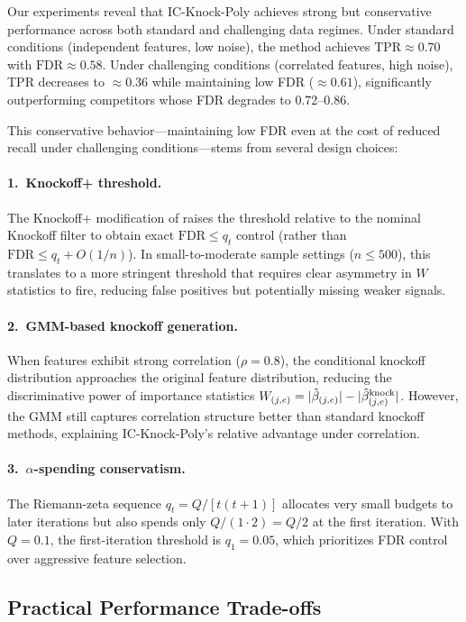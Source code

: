 \documentclass[11pt, a4paper]{article}
\newcommand{\FDR}{\mathrm{FDR}}
\begin{document}
Our experiments reveal that IC-Knock-Poly achieves strong but conservative
performance across both standard and challenging data regimes.  Under
standard conditions (independent features, low noise), the method achieves
$\mathrm{TPR} \approx 0.70$ with $\FDR \approx 0.58$.  Under challenging
conditions (correlated features, high noise), TPR decreases to $\approx 0.36$
while maintaining low FDR ($\approx 0.61$), significantly outperforming
competitors whose FDR degrades to 0.72--0.86.

This conservative behavior---maintaining low FDR even at the cost of
reduced recall under challenging conditions---stems from several design
choices:

\paragraph{1.\ Knockoff+ threshold.}
The Knockoff+ modification of \cite{barber2015controlling} raises the
threshold relative to the nominal Knockoff filter to obtain exact
$\FDR \leq q_t$ control (rather than $\FDR \leq q_t + O(1/n)$).  In
small-to-moderate sample settings ($n \leq 500$), this translates to a
more stringent threshold that requires clear asymmetry in $W$ statistics
to fire, reducing false positives but potentially missing weaker signals.

\paragraph{2.\ GMM-based knockoff generation.}
When features exhibit strong correlation ($\rho = 0.8$), the conditional
knockoff distribution approaches the original feature distribution,
reducing the discriminative power of importance statistics
$W_{(j,e)} = |\hat\beta_{(j,e)}| - |\hat\beta^{\rm knock}_{(j,e)}|$.
However, the GMM still captures correlation structure better than
standard knockoff methods, explaining IC-Knock-Poly's relative advantage
under correlation.

\paragraph{3.\ $\alpha$-spending conservatism.}
The Riemann-zeta sequence $q_t = Q/[t(t+1)]$ allocates very small budgets
to later iterations but also spends only $Q/(1 \cdot 2) = Q/2$ at the first
iteration.  With $Q = 0.1$, the first-iteration threshold is $q_1 = 0.05$,
which prioritizes FDR control over aggressive feature selection.

\subsection{Practical Performance Trade-offs}
\end{document}
